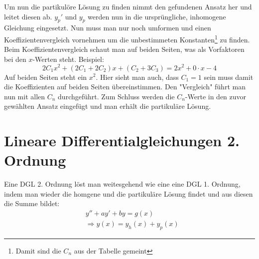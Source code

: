 \documentclass[a4paper,10pt]{scrartcl}
\begin{document}
        Um nun die partikulöre Lösung zu finden nimmt den gefundenen Ansatz her und leitet diesen ab. \(y_p'\) und \(y_p\) werden nun in die ursprüngliche, inhomogene
        Gleichung eingesetzt. Nun muss man nur noch umformen und einen Koeffizientenvergleich vornehmen um die unbestimmeten Konstanten\footnote{Damit sind die \(C_n\) aus der Tabelle gemeint} zu finden. \\
        Beim Koeffizientenvergleich schaut man auf beiden Seiten, was als Vorfaktoren bei den \(x\)-Werten steht. Beispiel: 
        \begin{equation*}
            2C_1x^2 + (2C_1 + 2C_2)x + (C_2+ 3C_3) = 2x^2 + 0 \cdot x - 4 
        \end{equation*}
        Auf beiden Seiten steht ein \(x^2\). Hier sieht man auch, dass \(C_1 = 1\) sein muss damit die Koeffizienten auf beiden Seiten übereinstimmen. Den "Vergleich" führt man 
        nun mit allen \(C_n\) durchgeführt. Zum Schluss werden die \(C_n\)-Werte in den zuvor gewählten Ansatz eingefügt und man erhält die partikuläre Lösung.  
    \section{Lineare Differentialgleichungen 2. Ordnung}
        Eine DGL 2. Ordnung löst man weitesgehend wie eine eine DGL 1. Ordnung, indem man wieder die homgene und die partikuläre Lösung findet und aus diesen  die Summe bildet:
        \begin{equation}
            \begin{aligned}
                & y'' + ay' + by = g(x) \\
                & \Rightarrow y(x) = y_h(x) + y_p(x) 
            \end{aligned}
        \end{equation}   
\end{document}

